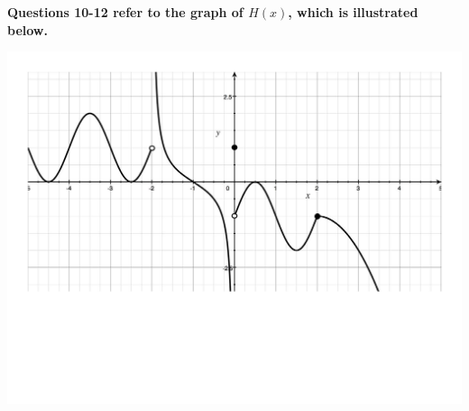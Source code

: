 \documentclass[12pt]{article}
\begin{document}
{\bf Questions 10-12 refer to the graph of $H(x)$, which is illustrated below.}

\begin{center}
\includegraphics[scale=0.5]{Limits3.pdf}
\end{center}
\end{document}
